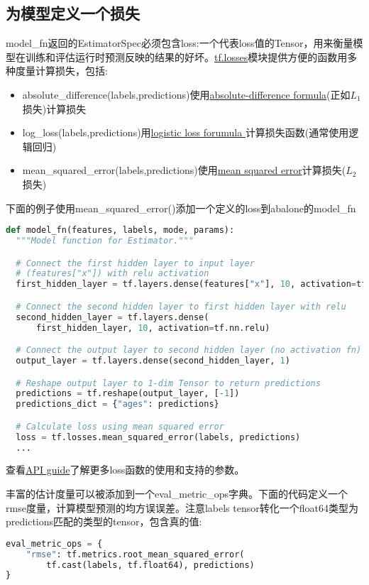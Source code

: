 \subsection{为模型定义一个损失}
model\_fn返回的EstimatorSpec必须包含loss:一个代表loss值的Tensor，用来衡量模型在训练和评估运行时预测反映的结果的好坏。\href{https://www.tensorflow.org/api_docs/python/tf/losses}{tf.losses}模块提供方便的函数用多种度量计算损失，包括:
\begin{itemize}
	\item absolute\_difference(labels,predictions)使用\href{https://en.wikipedia.org/wiki/Deviation_(statistics)#Unsigned_or_absolute_deviation}{absolute-difference formula}(正如$L_1$损失)计算损失
\item log\_loss(labels,predictions)用\href{https://en.wikipedia.org/wiki/Loss_functions_for_classification#Logistic_loss}{logistic loss forumula }计算损失函数(通常使用逻辑回归)
\item mean\_squared\_error(labels,predictions)使用\href{https://en.wikipedia.org/wiki/Mean_squared_error}{mean squared error}计算损失($L_2$损失)
\end{itemize}
下面的例子使用mean\_squared\_error()添加一个定义的loss到abalone的model\_fn
\begin{lstlisting}[language=Python]
def model_fn(features, labels, mode, params):
  """Model function for Estimator."""

  # Connect the first hidden layer to input layer
  # (features["x"]) with relu activation
  first_hidden_layer = tf.layers.dense(features["x"], 10, activation=tf.nn.relu)

  # Connect the second hidden layer to first hidden layer with relu
  second_hidden_layer = tf.layers.dense(
      first_hidden_layer, 10, activation=tf.nn.relu)

  # Connect the output layer to second hidden layer (no activation fn)
  output_layer = tf.layers.dense(second_hidden_layer, 1)

  # Reshape output layer to 1-dim Tensor to return predictions
  predictions = tf.reshape(output_layer, [-1])
  predictions_dict = {"ages": predictions}

  # Calculate loss using mean squared error
  loss = tf.losses.mean_squared_error(labels, predictions)
  ...
\end{lstlisting}
查看\href{https://www.tensorflow.org/api_guides/python/contrib.losses}{API guide}了解更多loss函数的使用和支持的参数。

丰富的估计度量可以被添加到一个eval\_metric\_ops字典。下面的代码定义一个rmse度量，计算模型预测的均方误误差。注意labels tensor转化一个float64类型为predictions匹配的类型的tensor，包含真的值:
\begin{lstlisting}[language=Python]
eval_metric_ops = {
    "rmse": tf.metrics.root_mean_squared_error(
        tf.cast(labels, tf.float64), predictions)
}
\end{lstlisting}
